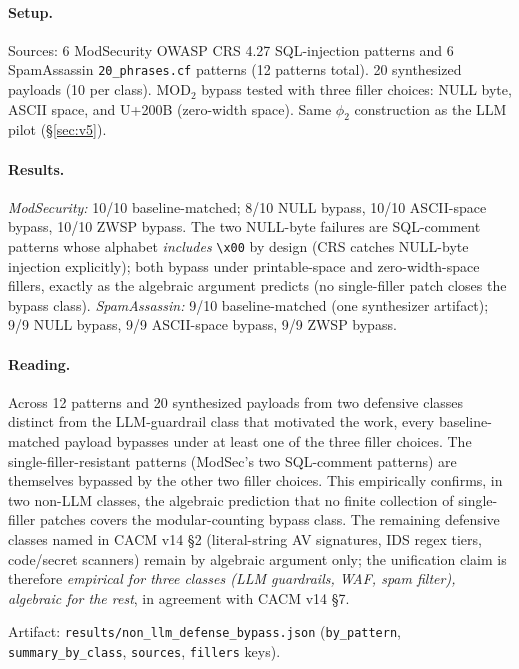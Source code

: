 \documentclass[letterpaper,twocolumn,10pt]{article}
\theoremstyle{definition}
\theoremstyle{remark}
\begin{document}
\paragraph{Setup.}
Sources: 6 ModSecurity OWASP CRS 4.27 SQL-injection patterns and 6
SpamAssassin \texttt{20\_phrases.cf} patterns (12 patterns total). 20
synthesized payloads (10 per class). $\mathrm{MOD}_2$ bypass tested with
three filler choices: NULL byte, ASCII space, and U+200B (zero-width
space). Same $\phi_2$ construction as the LLM pilot
(\S\ref{sec:v5}).

\paragraph{Results.}
\emph{ModSecurity:} 10/10 baseline-matched; 8/10 NULL bypass, 10/10
ASCII-space bypass, 10/10 ZWSP bypass. The two NULL-byte failures are
SQL-comment patterns whose alphabet \emph{includes} \verb|\x00| by design
(CRS catches NULL-byte injection explicitly); both bypass under
printable-space and zero-width-space fillers, exactly as the algebraic
argument predicts (no single-filler patch closes the bypass class).
\emph{SpamAssassin:} 9/10 baseline-matched (one synthesizer artifact);
9/9 NULL bypass, 9/9 ASCII-space bypass, 9/9 ZWSP bypass.

\paragraph{Reading.}
Across 12 patterns and 20 synthesized payloads from two defensive classes
distinct from the LLM-guardrail class that motivated the work, every
baseline-matched payload bypasses under at least one of the three filler
choices. The single-filler-resistant patterns (ModSec's two SQL-comment
patterns) are themselves bypassed by the other two filler choices. This
empirically confirms, in two non-LLM classes, the algebraic prediction
that no finite collection of single-filler patches covers the
modular-counting bypass class. The remaining defensive classes named in
CACM v14 \S2 (literal-string AV signatures, IDS regex tiers, code/secret
scanners) remain by algebraic argument only; the unification claim is
therefore \emph{empirical for three classes (LLM guardrails, WAF, spam
filter), algebraic for the rest}, in agreement with CACM v14 \S7.

Artifact: \texttt{results/\allowbreak non\_\allowbreak llm\_\allowbreak defense\_\allowbreak bypass.json}
(\texttt{by\_pattern}, \texttt{summary\_by\_class}, \texttt{sources},
\texttt{fillers} keys).
\end{document}
